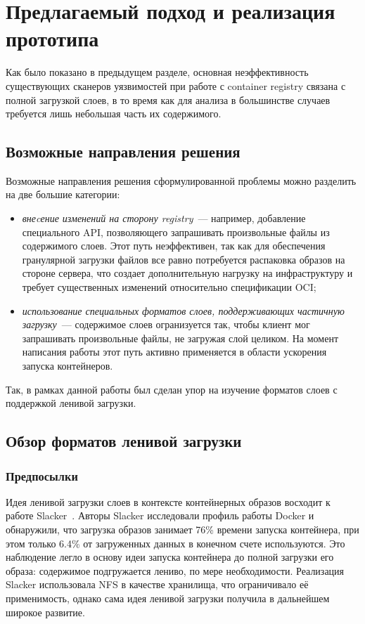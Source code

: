 \section{Предлагаемый подход и реализация прототипа}
\label{sec:Chapter4} 

Как было показано в предыдущем разделе, основная неэффективность существующих сканеров уязвимостей при работе с container registry связана с полной загрузкой слоев, в то время как для анализа в большинстве случаев требуется лишь небольшая часть их содержимого.

\subsection{Возможные направления решения}

Возможные направления решения сформулированной проблемы можно разделить на две большие категории:

\begin{itemize}
\item \textit{внеcение изменений на сторону registry}~--- например, добавление специального API, позволяющего запрашивать произвольные файлы из содержимого слоев. Этот путь неэффективен, так как для обеспечения гранулярной загрузки файлов все равно потребуется распаковка образов на стороне сервера, что создает дополнительную нагрузку на инфраструктуру и требует существенных изменений относительно спецификации OCI;
\item \textit{использование специальных форматов слоев, поддерживающих частичную загрузку}~--- содержимое слоев огранизуется так, чтобы клиент мог запрашивать произвольные файлы, не загружая слой целиком. На момент написания работы этот путь активно применяется в области ускорения запуска контейнеров.
\end{itemize}

Так, в рамках данной работы был сделан упор на изучение форматов слоев с поддержкой ленивой загрузки.

\subsection{Обзор форматов ленивой загрузки}

\subsubsection{Предпосылки}

Идея ленивой загрузки слоев в контексте контейнерных образов восходит к работе Slacker~\cite{harter2016slacker}. Авторы Slacker исследовали профиль работы Docker и обнаружили, что загрузка образов занимает 76\% времени запуска контейнера, при этом только 6.4\% от загруженных данных в конечном счете используются. Это наблюдение легло в основу идеи запуска контейнера до полной загрузки его образа: содержимое подгружается лениво, по мере необходимости. Реализация Slacker использовала NFS в качестве хранилища, что ограничивало её применимость, однако сама идея ленивой загрузки получила в дальнейшем широкое развитие.

